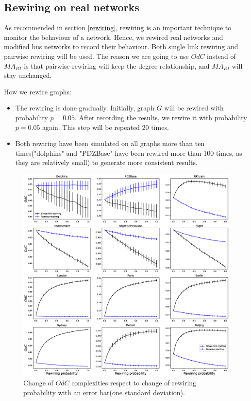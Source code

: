 \documentclass[12pt]{article}
\begin{document}
\subsection{Rewiring on real networks}
As recommended in section \ref{rewiring}, rewiring is an important technique to monitor the behaviour of a network. Hence, we rewired real networks and modified bus networks to record their behaviour. Both single link rewiring and pairwise rewiring will be used. The reason we are going to use $OdC$ instead of $MA_{RI}$ is that pairwise rewiring will keep the degree relationship, and $MA_{RI}$ will stay unchanged.\par
How we rewire graphs:
\begin{itemize}
    \item The rewiring is done gradually. Initially, graph $G$ will be rewired with probability $p=0.05$. After recording the results, we rewire it with probability $p=0.05$ again. This step will be repeated 20 times.
    \item Both rewiring have been simulated on all graphs more than ten times("dolphins" and "PDZBase" have been rewired more than 100 times, as they are relatively small) to generate more consistent results.
\end{itemize}
\begin{figure}[ht]
    \centering
    \includegraphics[width=\textwidth]{rewiring.eps}
    \caption{Change of $OdC$ complexities respect to change of rewiring probability with an error bar(one standard deviation).}
    \label{fig:rewiring}
\end{figure}
\end{document}
